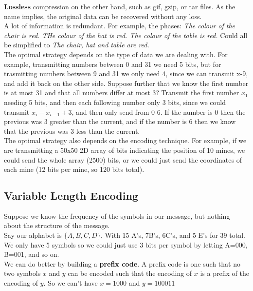 \documentclass[12pt]{article}
\theoremstyle{definition}
\begin{document}
\textbf{Lossless} compression on the other hand, such as gif, gzip, or tar files. As the name implies, the original data can be recovered without any loss.
\\ \linebreak
A lot of information is redundant. For example, the phases: \textit{The colour of the chair is red. THe colour of the hat is red. The colour of the table is red.} Could all be simplified to \textit{The chair, hat and table are red.}
\\ \linebreak
The optimal strategy depends on the type of data we are dealing with. For example, transmitting numbers between 0 and 31 we need 5 bits, but for trasmitting numbers between 9 and 31 we only need 4, since we can transmit x-9, and add it back on the other side. Suppose further that we know the first number is at most 31 and that all numbers differ at most 3? Transmit the first number $x_1$ needing 5 bits, and then each following number only 3 bits, since we could transmit $x_i - x_{i-1} + 3$, and then only send from 0-6. If the number is 0 then the previous was 3 greater than the current, and if the number is 6 then we know that the previous was 3 less than the current.
\\ \linebreak
The optimal strategy also depends on the encoding technique. For example, if we are transmitting a 50x50 2D array of bits indicating the position of 10 mines, we could send the whole array (2500) bits, or we could just send the coordinates of each mine (12 bits per mine, so 120 bits total).

\subsection{Variable Length Encoding}
Suppose we know the frequency of the symbols in our message, but nothing about the structure of the message. 
\\ \linebreak
Say our alphabet is $\{A, B, C, D\}$. With 15 A's, 7B's, 6C's, and 5 E's for 39 total. We only have 5 symbols so we could just use 3 bits per symbol by letting A=000, B=001, and so on. 
\\ \linebreak
We can do better by building a \textbf{prefix code}. A prefix code is one such that no two symbols $x$ and $y$ can be encoded such that the encoding of $x$ is a prefix of the encoding of $y$. So we can't have $x=1000$ and $y=100011$
\end{document}
